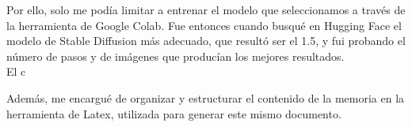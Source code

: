 Por ello, solo me podía limitar a entrenar el modelo que seleccionamos a través de la herramienta de Google Colab. Fue entonces cuando busqué en Hugging Face el modelo de Stable Diffusion más adecuado, que resultó ser el 1.5, y fui probando el número de pasos y de imágenes que producían los mejores resultados. \\

El c


Además, me encargué de organizar y estructurar el contenido de la memoria en la herramienta de Latex, utilizada para generar este mismo documento. \\


